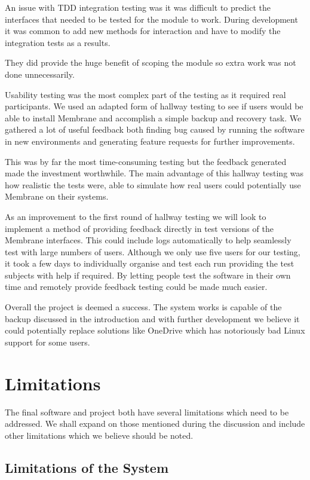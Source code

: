 \documentclass[11pt, a4paper, twocolumn, twoside]{report}
\begin{document}
An issue with TDD integration testing was it was difficult to predict the interfaces that needed to be tested for the module to work. During development it was common to add new methods for interaction and have to modify the integration tests as a results.

They did provide the huge benefit of scoping the module so extra work was not done unnecessarily.

Usability testing was the most complex part of the testing as it required real participants. We used an adapted form of hallway testing to see if users would be able to install Membrane and accomplish a simple backup and recovery task. We gathered a lot of useful feedback both finding bug caused by running the software in new environments and generating feature requests for further improvements.

This was by far the most time-consuming testing but the feedback generated made the investment worthwhile. The main advantage of this hallway testing was how realistic the tests were, able to simulate how real users could potentially use Membrane on their systems.

As an improvement to the first round of hallway testing we will look to implement a method of providing feedback directly in test versions of the Membrane interfaces. This could include logs automatically to help seamlessly test with large numbers of users. Although we only use five users for our testing, it took a few days to individually organise and test each run providing the test subjects with help if required. By letting people test the software in their own time and remotely provide feedback testing could be made much easier.

Overall the project is deemed a success. The system works is capable of the backup discussed in the introduction and with further development we believe it could potentially replace solutions like OneDrive which has notoriously bad Linux support for some users.

\section{Limitations}

The final software and project both have several limitations which need to be addressed. We shall expand on those mentioned during the discussion and include other limitations which we believe should be noted.

\subsection{Limitations of the System}
\end{document}
